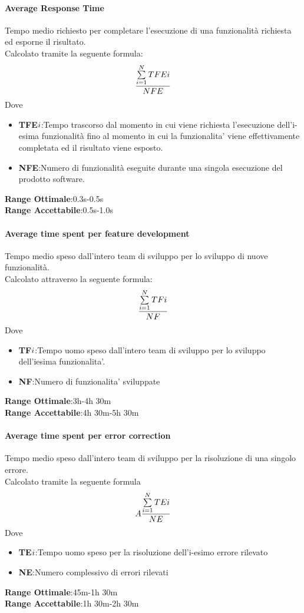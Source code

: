 \paragraph{Average Response Time}
\begin{flushleft}
Tempo medio richiesto per completare l'esecuzione di una funzionalità richiesta ed esporne il risultato.\\
Calcolato tramite la seguente formula:
$$\frac{\sum\limits_{i=1}^N TFE{\small{i}}}{NFE}$$
Dove
\begin{itemize}
\item{\textbf{TFE${\small{i}}$}}:Tempo trascorso dal momento in cui viene richiesta l'esecuzione dell'i-esima funzionalità fino al momento in cui la funzionalita' viene effettivamente completata ed il risultato viene esposto.
\item{\textbf{NFE}}:Numero di funzionalità eseguite durante una singola esecuzione del prodotto software.
\end{itemize}
\textbf{Range Ottimale}:0.3s-0.5s \\
\textbf{Range Accettabile}:0.5s-1.0s
\end{flushleft}
\paragraph{Average time spent per feature development}
\begin{flushleft}
Tempo medio speso dall'intero team di sviluppo per lo sviluppo di nuove funzionalità.\\
Calcolato attraverso la seguente formula:
	$$\frac{\sum\limits_{i=1}^N TF{\small{i}}}{NF}$$
Dove
\begin{itemize}
	\item{\textbf{TF${\small{i}}$}}:Tempo uomo speso dall'intero team di sviluppo per lo sviluppo dell'iesima funzionalita'.
	\item{\textbf{NF}}:Numero di funzionalita' sviluppate
\end{itemize}
\textbf{Range Ottimale}:3h-4h 30m \\
\textbf{Range Accettabile}:4h 30m-5h 30m
\end{flushleft}
\paragraph{Average time spent per error correction}
\begin{flushleft}
Tempo medio speso dall'intero team di sviluppo per la risoluzione di una singolo errore.\\
Calcolato tramite la seguente formula
	$$A\frac{\sum\limits_{i=1}^N TE{\small{i}}}{NE}$$
Dove
\begin{itemize}
	\item{\textbf{TE${\small{i}}$}}:Tempo uomo speso per la risoluzione dell'i-esimo errore rilevato
	\item{\textbf{NE}}:Numero complessivo di errori rilevati
\end{itemize}
\textbf{Range Ottimale}:45m-1h 30m \\
\textbf{Range Accettabile}:1h 30m-2h 30m
\end{flushleft}
